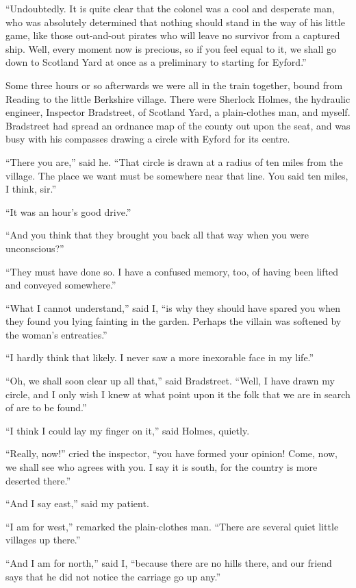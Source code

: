 “Undoubtedly. It is quite clear that the colonel was a
cool and desperate man, who was absolutely determined
that nothing should stand in the way of his little game, like
those out-and-out pirates who will leave no survivor from a
captured ship. Well, every moment now is precious, so if
you feel equal to it, we shall go down to Scotland Yard at
once as a preliminary to starting for Eyford.”

Some three hours or so afterwards we were all in the train
together, bound from Reading to the little Berkshire village.
There were Sherlock Holmes, the hydraulic engineer, Inspector
Bradstreet, of Scotland Yard, a plain-clothes man, and myself.
Bradstreet had spread an ordnance map of the county
out upon the seat, and was busy with his compasses drawing
a circle with Eyford for its centre.

“There you are,” said he. “That circle is drawn at a radius
of ten miles from the village. The place we want must
be somewhere near that line. You said ten miles, I think, sir.”

“It was an hour’s good drive.”

“And you think that they brought you back all that way
when you were unconscious?”

“They must have done so. I have a confused memory,
too, of having been lifted and conveyed somewhere.”

“What I cannot understand,” said I, “is why they should
have spared you when they found you lying fainting in the
garden. Perhaps the villain was softened by the woman’s
entreaties.”

“I hardly think that likely. I never saw a more inexorable
face in my life.”

“Oh, we shall soon clear up all that,” said Bradstreet.
“Well, I have drawn my circle, and I only wish I knew at
what point upon it the folk that we are in search of are to be
found.”

“I think I could lay my finger on it,” said Holmes, quietly.

“Really, now!” cried the inspector, “you have formed your
opinion! Come, now, we shall see who agrees with you. I
say it is south, for the country is more deserted there.”

“And I say east,” said my patient.

“I am for west,” remarked the plain-clothes man. “There
are several quiet little villages up there.”

“And I am for north,” said I, “because there are no hills
there, and our friend says that he did not notice the carriage
go up any.”

